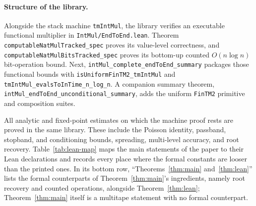 {\sloppy\paragraph{Structure of the library.}
Alongside the stack machine \texttt{tmIntMul}, the library verifies an executable functional multiplier in \texttt{IntMul/\allowbreak EndToEnd.lean}. Theorem \texttt{computableNatMulTracked\_\allowbreak spec} proves its value-level correctness, and \texttt{computableNatMulBitsTracked\_\allowbreak spec} proves its bottom-up counted $O(n \log n)$ bit-operation bound. Next, \texttt{intMul\_\allowbreak complete\_\allowbreak endToEnd\_\allowbreak summary} packages those functional bounds with \texttt{isUniform\allowbreak FinTM2\_\allowbreak tmIntMul} and \texttt{tmIntMul\_\allowbreak evalsToInTime\_\allowbreak n\_\allowbreak log\_\allowbreak n}. A companion summary theorem, \texttt{intMul\_\allowbreak endToEnd\_\allowbreak unconditional\_\allowbreak summary}, adds the uniform \texttt{FinTM2} primitive and composition suites.

All analytic and fixed-point estimates on which the machine proof rests are proved in the same library. These include the Poisson identity, passband, stopband, and conditioning bounds, spreading, multi-level accuracy, and root recovery. Table~\ref{tab:lean-map} maps the main statements of the paper to their Lean declarations and records every place where the formal constants are looser than the printed ones. In its bottom row, ``Theorems~\ref{thm:main} and~\ref{thm:lean}'' lists the formal counterparts of Theorem~\ref{thm:main}'s ingredients, namely root recovery and counted operations, alongside Theorem~\ref{thm:lean}; Theorem~\ref{thm:main} itself is a multitape statement with no formal counterpart.\par}

